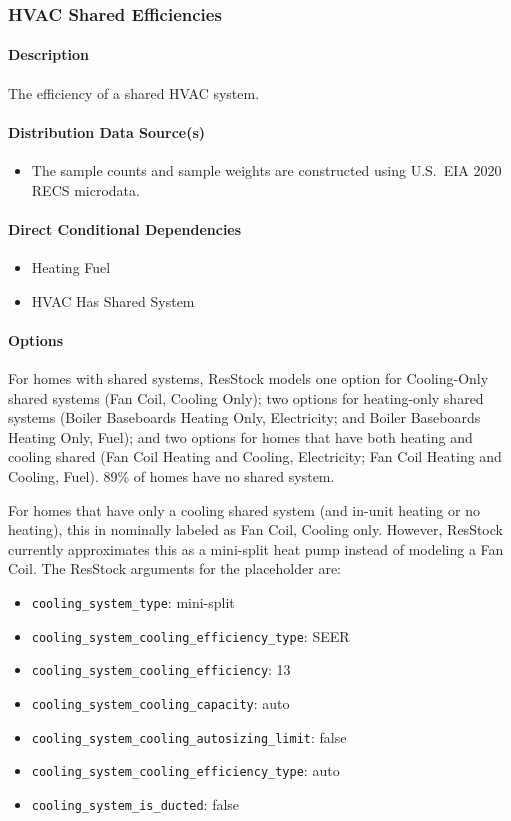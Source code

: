 \subsubsection{HVAC Shared Efficiencies}

\paragraph{Description}
The efficiency of a shared HVAC system.

\paragraph{Distribution Data Source(s)}
\begin{itemize}
    \item The sample counts and sample weights are constructed using U.S.~EIA 2020 RECS microdata.
\end{itemize}

\paragraph{Direct Conditional Dependencies}
\begin{itemize}
    \item Heating Fuel
    \item HVAC Has Shared System
\end{itemize}
\paragraph{Options}
For homes with shared systems, ResStock models one option for Cooling-Only shared systems (Fan Coil, Cooling Only); two options for heating-only shared systems (Boiler Baseboards Heating Only, Electricity; and Boiler Baseboards Heating Only, Fuel); and two options for homes that have both heating and cooling shared (Fan Coil Heating and Cooling, Electricity; Fan Coil Heating and Cooling, Fuel). 89\% of homes have no shared system.  


For homes that have only a cooling shared system (and in-unit heating or no heating), this in nominally labeled as Fan Coil, Cooling only. However, ResStock currently approximates this as a mini-split heat pump instead of modeling a Fan Coil. The ResStock arguments for the placeholder are:
\begin{itemize}
    \item \texttt{cooling\_system\_type}: mini-split
    \item \texttt{cooling\_system\_cooling\_efficiency\_type}: SEER
    \item \texttt{cooling\_system\_cooling\_efficiency}: 13
    \item \texttt{cooling\_system\_cooling\_capacity}: auto
    \item \texttt{cooling\_system\_cooling\_autosizing\_limit}: false
    \item \texttt{cooling\_system\_cooling\_efficiency\_type}: auto
    \item \texttt{cooling\_system\_is\_ducted}: false
\end{itemize}


